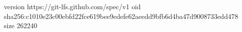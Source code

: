 version https://git-lfs.github.com/spec/v1
oid sha256:c1010e23c00ebfd22fce619bee9edefe62aeedd9bfb6d4ba47d9008733edd478
size 262240
